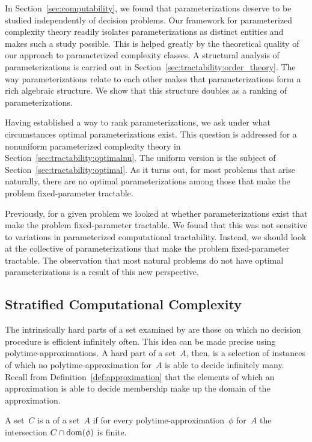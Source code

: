 In Section~\ref{sec:computability}, we found that parameterizations deserve to be studied independently of decision problems.
Our framework for parameterized complexity theory readily isolates parameterizations as distinct entities and makes such a study possible.
This is helped greatly by the theoretical quality of our approach to parameterized complexity classes.
A structural analysis of parameterizations is carried out in Section~\ref{sec:tractability:order_theory}.
The way parameterizations relate to each other makes that parameterizations form a rich algebraic structure.
We show that this structure doubles as a ranking of parameterizations.

Having established a way to rank parameterizations, we ask under what circumstances optimal parameterizations exist.
This question is addressed for a nonuniform parameterized complexity theory in Section~\ref{sec:tractability:optimalnu}.
The uniform version is the subject of Section~\ref{sec:tractability:optimal}.
As it turns out, for most problems that arise naturally, there are no optimal parameterizations among those that make the problem fixed-parameter tractable.

Previously, for a given problem we looked at whether parameterizations exist that make the problem fixed-parameter tractable.
We found that this was not sensitive to variations in parameterized computational tractability.
Instead, we should look at the collective of parameterizations that make the problem fixed-parameter tractable.
The observation that most natural problems do not have optimal parameterizations is a result of this new perspective.

\subsection{Stratified Computational Complexity}
\label{sec:tractability:stratified}%
The intrinsically hard parts of a set examined by \citeauthor{lynch1975reducibility} are those on which no decision procedure is efficient infinitely often.
This idea can be made precise using polytime-approximations.
A hard part of a set~$A$, then, is a selection of instances of which no polytime-approximation for~$A$ is able to decide infinitely many.
Recall from Definition~\ref{def:approximation} that the elements of which an approximation is able to decide membership make up the domain of the approximation.
\begin{definition}
  A set~$C$ is a  of a set~$A$ if for every polytime-approximation~$\phi$ for~$A$ the intersection $C \cap \operatorname{dom}(\phi)$ is finite.
\end{definition}

